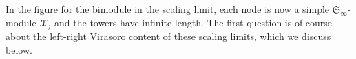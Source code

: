 \documentclass[11pt]{article}
\newcommand{\q}{\mathfrak{q}}
\newcommand{\JTL}[1]{JTL_{#1}}
\newcommand{\LQGodd}{U^{\text{odd}}_{\q} s\ell(2)}
\newcommand{\interLie}{\mathfrak{S}}
\newcommand{\interinfin}{\interLie_{\infty}}
\newcommand{\interM}[1]{\mathscr{X}_{#1}}
\newcommand{\APrTL}[1]{\widehat{\mathscr{P}}_{#1}}
\theoremstyle{definition}
\begin{document}
In the figure for the bimodule in the scaling limit, each node is now a simple $\interinfin$-module $\interM{j}$ and the towers have infinite length.
  The first question is of course about the left-right Virasoro content of these scaling limits, which we discuss below.

\end{document}
